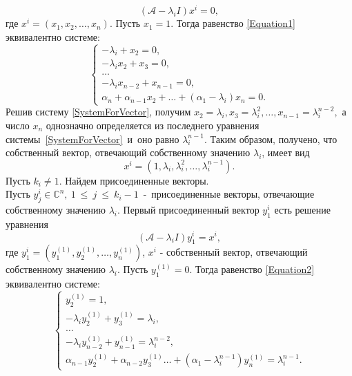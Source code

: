 \begin{equation}\label{Equation1}
\left(\mathcal{A}-\lambda_i I \right) x^i = 0,
\end{equation}
где $x^i = \left( x_1, x_2, \dots, x_n \right)$. Пусть $x_1 = 1$. Тогда равенство \eqref{Equation1} эквивалентно системе:
\begin{equation}\label{SystemForVector}
\begin{cases}
-\lambda_i + x_2 = 0, \\
-\lambda_i x_2 + x_3 = 0, \\
\dots \\
-\lambda_i x_{n-2} + x_{n-1} = 0, \\
\alpha_n + \alpha_{n-1} x_2 + \dots + (\alpha_1 - \lambda_i) x_n = 0.
\end{cases}
\end{equation}
Решив систему \eqref{SystemForVector}, получим
$
x_2=\lambda_i, x_3=\lambda_i^2, \dots, x_{n-1} = \lambda_i^{n-2},
$
а число $x_n$ однозначно определяется из последнего уравнения системы~\eqref{SystemForVector}~и~оно равно $\lambda_i^{n-1}$. Таким образом, получено, что собственный вектор, отвечающий собственному значению $\lambda_i$, имеет вид
$$
x^i = \left( 1, \lambda_i, \lambda_i ^2, \dots, \lambda_i ^{n-1} \right).
$$
Пусть $k_i \ne 1$. Найдем присоединенные векторы. \\
Пусть $y^i_j \in \mathbb{C}^n,~1~\le~j~\le~k_i-1$~-~присоединенные векторы, отвечающие собственному значению $\lambda_i$. Первый присоединенный вектор $y^i_1$ есть решение уравнения
\begin{equation}\label{Equation2}
\left(\mathcal{A}-\lambda_i I \right) y^i_1 = x^i,
\end{equation}
где $y^i_1 =  \left( y_1^{(1)}, y_2^{(1)}, \dots, y_n^{(1)} \right)$, $x^i$ - собственный вектор, отвечающий собственному значению $\lambda_i$. Пусть $y_1^{(1)} = 0$. Тогда равенство \eqref{Equation2} эквивалентно системе:
\begin{equation}\label{SystemForVect}
\begin{cases}
y_2^{(1)} = 1, \\
-\lambda_i y_2^{(1)} + y_3^{(1)} = \lambda_i, \\
\dots \\
-\lambda_i y_{n-2}^{(1)} + y_{n-1}^{(1)} = \lambda_i ^{n-2}, \\
\alpha_{n-1} y_2^{(1)} + \alpha_{n-2} y_3^{(1)} \dots + (\alpha_1 - \lambda_i ^{n-1}) y_n^{(1)} = \lambda_i ^{n-1}.
\end{cases}
\end{equation}

